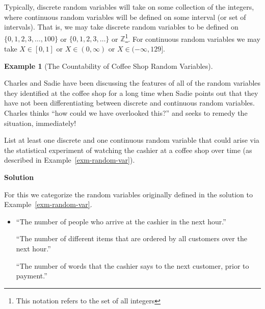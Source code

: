 \documentclass[
  letterpaper,
  DIV=11,
  numbers=noendperiod]{scrreprt}
\theoremstyle{definition}
\theoremstyle{definition}
\theoremstyle{definition}
\newtheorem{example}{Example}[chapter]
\theoremstyle{remark}
\begin{document}


Typically, discrete random variables will take on some collection of the
integers, where continuous random variables will be defined on some
interval (or set of intervals). That is, we may take discrete random
variables to be defined on \(\{0,1,2,3,\dots,100\}\) or
\(\{0,1,2,3,\dots\}\) or \(\mathbb{Z}\)\footnote{This notation refers to
  the set of all integers}. For continuous random variables we may take
\(X \in [0,1]\) or \(X \in (0,\infty)\) or \(X\in (-\infty,129]\).

\begin{example}[The Countability of Coffee Shop Random
Variables]\protect\hypertarget{exm-discrete-vs-continuous-rv}{}\label{exm-discrete-vs-continuous-rv}

Charles and Sadie have been discussing the features of all of the random
variables they identified at the coffee shop for a long time when Sadie
points out that they have not been differentiating between discrete and
continuous random variables. Charles thinks ``how could we have
overlooked this?'' and seeks to remedy the situation, immediately!

List at least one discrete and one continuous random variable that could
arise via the statistical experiment of watching the cashier at a coffee
shop over time (as described in Example~\ref{exm-random-var}).

\begin{tcolorbox}[enhanced jigsaw, colback=white, breakable, rightrule=.15mm, leftrule=.75mm, toprule=.15mm, left=2mm, arc=.35mm, opacityback=0, bottomrule=.15mm]

\vspace{-3mm}\textbf{Solution}\vspace{3mm}

For this we categorize the random variables originally defined in the
solution to Example~\ref{exm-random-var}.

\begin{itemize}
\item
  ``The number of people who arrive at the cashier in the next hour.''

  ``The number of different items that are ordered by all customers over
  the next hour.''

  ``The number of words that the cashier says to the next customer,
  prior to payment.''


\end{itemize}
\end{tcolorbox}
\end{example}
\end{document}
